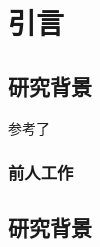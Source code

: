 \chapter{引言}

\section{研究背景}
参考了 \parencite{曾谨言2013量子力学} \parencite{feynman2011feynman} \parencite{zurek2014quantum}
\parencite{wikimedia:stern-gerlach-experiment, zettili2003quantum}
\subsection{前人工作}

\section{研究背景}
